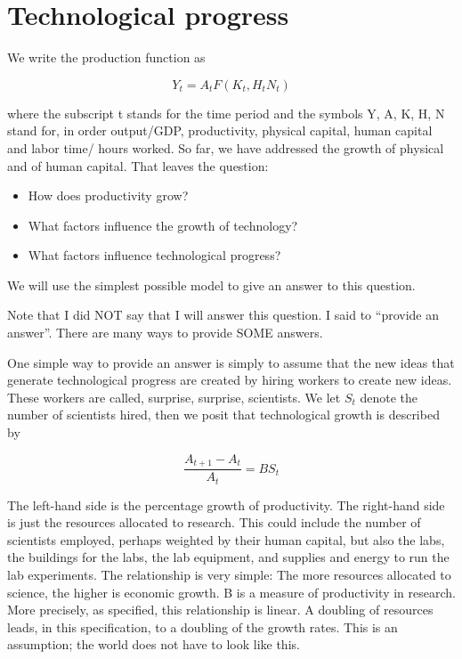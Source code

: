 \documentclass[
]{book}
\providecommand{\tightlist}{%
  \setlength{\itemsep}{0pt}\setlength{\parskip}{0pt}}
\begin{document}
\hypertarget{technological-progress}{%
\section{Technological progress}\label{technological-progress}}

We write the production function as

\[Y_t  =  A_t F( K_t, H_tN_t)\]

where the subscript t stands for the time period and the symbols Y, A, K, H, N stand for, in order output/GDP, productivity, physical capital, human capital and labor time/ hours worked. So far, we have addressed the growth of physical and of human capital. That leaves the question:

\begin{itemize}
\tightlist
\item
  How does productivity grow?
\item
  What factors influence the growth of technology?
\item
  What factors influence technological progress?
\end{itemize}

We will use the simplest possible model to give an answer to this question.

Note that I did NOT say that I will answer this question. I said to ``provide an answer''. There are many ways to provide SOME answers.

One simple way to provide an answer is simply to assume that the new ideas that generate technological progress are created by hiring workers to create new ideas. These workers are called, surprise, surprise, scientists. We let \(S_t\) denote the number of scientists hired, then we posit that technological growth is described by

\[ \frac{A_{t+1} - A_t}{A_t}  =  B S_t \]

The left-hand side is the percentage growth of productivity. The right-hand side is just the resources allocated to research. This could include the number of scientists employed, perhaps weighted by their human capital, but also the labs, the buildings for the labs, the lab equipment, and supplies and energy to run the lab experiments. The relationship is very simple: The more resources allocated to science, the higher is economic growth. B is a measure of productivity in research. More precisely, as specified, this relationship is linear. A doubling of resources leads, in this specification, to a doubling of the growth rates. This is an assumption; the world does not have to look like this.
\end{document}
